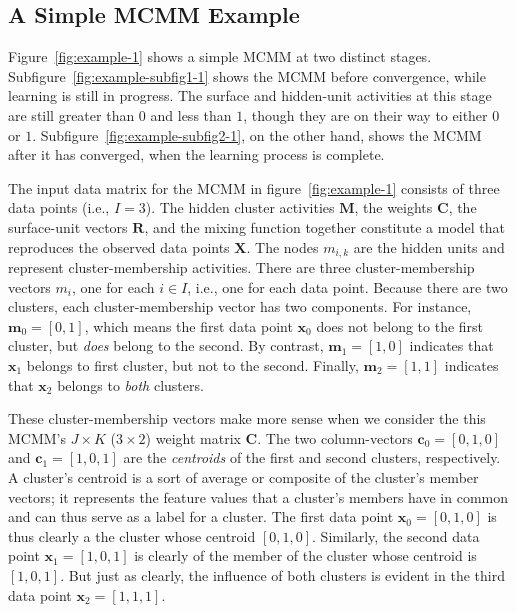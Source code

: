 {\subsection{A Simple MCMM Example}
\label{subsec:example}

Figure~\ref{fig:example-1} shows a simple MCMM at two distinct stages. Subfigure~\ref{fig:example-subfig1-1} shows the MCMM before convergence, while learning is still in progress. The surface and hidden-unit activities at this stage are still greater than $0$ and less than $1$, though they are on their way to either $0$ or $1$. Subfigure~\ref{fig:example-subfig2-1}, on the other hand, shows the MCMM after it has converged, when the learning process is complete.

The input data matrix for the MCMM in figure~\ref{fig:example-1} consists of three data points (i.e., $I = 3$).
The hidden cluster activities $\mathbf{M}$, the weights $\mathbf{C}$, the surface-unit vectors $\mathbf{R}$,
and the mixing function together constitute a model that reproduces the
observed data points $\mathbf{X}$.
The nodes $m_{i,k}$ are the hidden units and represent cluster-membership activities. There are three cluster-membership vectors $m_{i}$, one for each $i \in I$, i.e., one for each data point. Because there are two clusters, each cluster-membership vector has two components. For instance, $\textbf{m}_{0} = [0, 1]$, which means the first data point $\textbf{x}_{0}$ does not belong to the first cluster, but \emph{does} belong to the second. By contrast, $\textbf{m}_{1} = [1,0]$ indicates that $\textbf{x}_{1}$ belongs to first cluster, but not to the second. Finally, $\textbf{m}_{2} = [1,1]$ indicates that  $\textbf{x}_{2}$ belongs to \emph{both} clusters. 

These cluster-membership vectors make more sense when we consider the this MCMM's $J \times K$ ($3 \times 2$) weight matrix $\textbf{C}$. The two column-vectors $\textbf{c}_0 = [0,1,0]$ and $\textbf{c}_1 = [1,0,1]$ are the \emph{centroids} of the first and second clusters, respectively. A cluster's centroid is a sort of average or composite of the cluster's member vectors; it represents the feature values that a cluster's members have in common and can thus serve as a label for a cluster. The first data point $\textbf{x}_0 = [0,1,0]$ is thus clearly a the cluster whose centroid  $[0,1,0]$. Similarly, the second data point $\textbf{x}_1 = [1,0,1]$ is clearly of the member of the cluster whose centroid is $[1,0,1]$. But just as clearly, the influence of both clusters is evident in the third data point $\textbf{x}_2 = [1,1,1]$.

}
